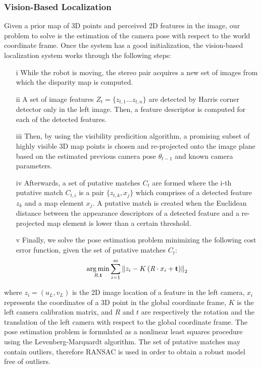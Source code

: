 \documentclass[conference]{IEEEtran}
\DeclareMathOperator*{\argmin}{arg\,min}
\begin{document}
\subsubsection{Vision-Based Localization}
Given a prior map of 3D points and perceived 2D features in the image, our problem to solve is the estimation of the camera pose with respect to the world coordinate frame. Once the system has a good initialization, the vision-based localization system works through the following steps:
%
\begin{enumerate}
\item[i] While the robot is moving, the stereo pair acquires a new set of images from which the disparity map is computed.
\item[ii] A set of image features $Z_{t}=\{z_{t,1} \ldots z_{t,n}\}$ are detected by Harris corner detector only in the left image. Then, a feature descriptor is computed for each of the detected features. 
\item[iii] Then, by using the visibility predicition algorithm, a promising subset of highly visible 3D map points is chosen and re-projected onto the image plane based on the estimated previous camera pose $\theta_{t-1}$ and known camera parameters.
\item[iv] Afterwards, a set of putative matches $C_{t}$ are formed where the i-th putative match $C_{t,i}$ is a pair $\{z_{t,k},x_{j}\}$ which comprises of a detected feature $z_{k}$ and a map element $x_{j}$. A putative match is created when the Euclidean distance between the appearance descriptors of a detected feature and a re-projected map element is lower than a certain threshold. 
\item[v] Finally, we solve the pose estimation problem minimizing the following cost error function, given the set of putative matches $C_{t}$:
%
\begin{equation} \label{eq:pose_estimation}
\argmin \limits_{\emph{R},\mathbf{t}} \sum \limits_{i=1}^{m} \left\|z_{i} - K \left(\emph{R}\cdot x_{i} + \mathbf{t} \right)\right\|_{2}  
\end{equation}
%
\end{enumerate}
where $z_{i}=\left(u_{L},v_{L}\right)$ is the 2D image location of a feature in the left camera, $x_{i}$ represents the coordinates of a 3D point in the global coordinate frame, $K$ is the left camera calibration matrix, and $R$ and $t$ are respectively the rotation and the translation of the left camera with respect to the global coordinate frame. The pose estimation problem is formulated as a nonlinear least squares procedure using the Levenberg-Marquardt algorithm. The set of putative matches may contain outliers, therefore RANSAC is used in order to obtain a robust model free of outliers. 
\end{document}

